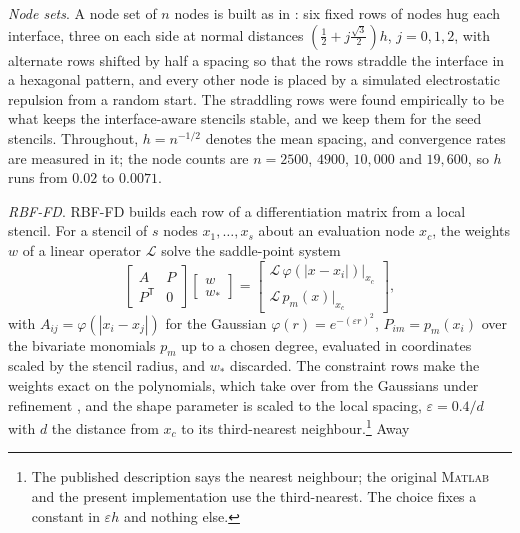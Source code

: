 \documentclass[11pt]{amsart}
\theoremstyle{definition}
\theoremstyle{remark}
\newcommand{\para}[1]{\par\smallskip\noindent\textit{#1}.\enspace}
\begin{document}
\para{Node sets}
A node set of $n$ nodes is built as in \cite{MartinFornberg2017}: six
fixed rows of nodes hug each interface, three on each side at normal
distances $(\tfrac12 + j \tfrac{\sqrt 3}{2}) h$, $j = 0, 1, 2$, with
alternate rows shifted by half a spacing so that the rows straddle the
interface in a hexagonal pattern, and every other node is placed by a
simulated electrostatic repulsion from a random start. The straddling
rows were found empirically to be what keeps the interface-aware
stencils stable, and we keep them for the seed stencils. Throughout,
$h = n^{-1/2}$ denotes the mean spacing, and convergence rates are
measured in it; the node counts are $n = 2500$, $4900$, $10{,}000$ and
$19{,}600$, so $h$ runs from $0.02$ to $0.0071$.

\para{RBF-FD}
RBF-FD \cite{FornbergFlyer2015primer,FornbergFlyer2015acta} builds each
row of a differentiation matrix from a local stencil. For a stencil of $s$
nodes $x_1, \ldots, x_s$ about an evaluation node $x_c$, the weights $w$
of a linear operator $\mathcal{L}$ solve the saddle-point system
\begin{equation}
  \label{eq:rbffd}
  \begin{bmatrix} A & P \\ P^{\mathsf T} & 0 \end{bmatrix}
  \begin{bmatrix} w \\ w_* \end{bmatrix}
  =
  \begin{bmatrix}
    \mathcal{L}\, \varphi(|x - x_i|) \big|_{x_c} \\
    \mathcal{L}\, p_m(x) \big|_{x_c}
  \end{bmatrix},
\end{equation}
with $A_{ij} = \varphi(|x_i - x_j|)$ for the Gaussian
$\varphi(r) = e^{-(\varepsilon r)^2}$, $P_{im} = p_m(x_i)$ over the
bivariate monomials $p_m$ up to a chosen degree, evaluated in
coordinates scaled by the stencil radius, and $w_*$ discarded. The constraint rows make the weights
exact on the polynomials, which take over from the Gaussians under
refinement \cite{FlyerFornbergBayonaBarnett2016,BayonaFlyerFornbergBarnett2017},
and the shape parameter is scaled to the local spacing,
$\varepsilon = 0.4 / d$ with $d$ the distance from $x_c$ to its
third-nearest neighbour.\footnote{The published description
\cite{MartinFornberg2017} says the nearest neighbour; the original
\textsc{Matlab} and the present implementation use the third-nearest.
The choice fixes a constant in $\varepsilon h$ and nothing else.} Away
\end{document}
